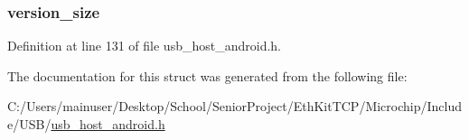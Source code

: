 \hypertarget{struct_a_n_d_r_o_i_d___a_c_c_e_s_s_o_r_y___i_n_f_o_r_m_a_t_i_o_n_ad7205f873eb7954ed0093b9ffbb2bb52}{}
\subsubsection[{version\+\_\+size}]{ version\+\_\+size}\label{struct_a_n_d_r_o_i_d___a_c_c_e_s_s_o_r_y___i_n_f_o_r_m_a_t_i_o_n_ad7205f873eb7954ed0093b9ffbb2bb52}


Definition at line 131 of file usb\+\_\+host\+\_\+android.\+h.



The documentation for this struct was generated from the following file\+:\begin{DoxyCompactItemize}
\item 
C\+:/\+Users/mainuser/\+Desktop/\+School/\+Senior\+Project/\+Eth\+Kit\+T\+C\+P/\+Microchip/\+Include/\+U\+S\+B/\hyperlink{usb__host__android_8h}{usb\+\_\+host\+\_\+android.\+h}\end{DoxyCompactItemize}
